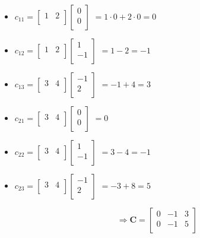\documentclass[a4paper, 12pt]{article}
\theoremstyle{definition}
\begin{document}
\begin{itemize}
    \item $ c_{11} = \begin{bmatrix}
        1 & 2 \\
    \end{bmatrix}
    \begin{bmatrix}
        0 \\
        0 \\
    \end{bmatrix}$
    $ = 1 \cdot 0 + 2 \cdot 0 = 0 $
    \item $ c_{12} = \begin{bmatrix}
        1 & 2 \\
    \end{bmatrix}
    \begin{bmatrix}
        1 \\
        -1 \\
    \end{bmatrix}$
    $ = 1 - 2 = -1 $
    \item $ c_{13} = \begin{bmatrix}
        3 & 4 \\
    \end{bmatrix}
    \begin{bmatrix}
        -1 \\
        2 \\
    \end{bmatrix}$
    $ = -1 + 4 = 3 $
    \item $ c_{21} = \begin{bmatrix}
        3 & 4 \\
    \end{bmatrix}
    \begin{bmatrix}
        0 \\
        0 \\
    \end{bmatrix}$
    $ = 0 $
    \item $ c_{22} = \begin{bmatrix}
        3 & 4 \\
    \end{bmatrix}
    \begin{bmatrix}
        1 \\
        -1 \\
    \end{bmatrix}$
    $ = 3 -4 = -1 $
    \item $ c_{23} = \begin{bmatrix}
        3 & 4 \\
    \end{bmatrix}
    \begin{bmatrix}
        -1 \\
        2 \\
    \end{bmatrix}$
    $ = -3 + 8 = 5 $

\[ 
\Rightarrow
\boldsymbol{C} = \begin{bmatrix}
    0 & -1 & 3 \\
    0 & -1 & 5 \\
    \end{bmatrix}
\]
\end{itemize}
\end{document}
